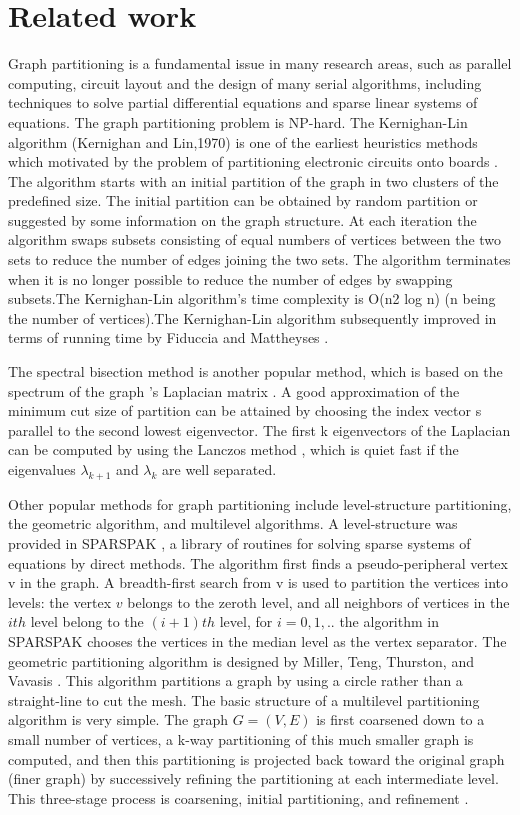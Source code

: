 \documentclass{acm_proc_article-sp}
\begin{document}
\section{Related work}
Graph partitioning is a fundamental issue in many research areas, such as parallel computing, circuit layout and the design of many serial algorithms, including techniques to solve partial differential equations and sparse linear systems of equations. The graph partitioning problem is NP-hard. The Kernighan-Lin algorithm (Kernighan and Lin,1970) is one of the earliest heuristics methods which motivated by the problem of partitioning electronic circuits onto boards \cite{kl:partition}. The algorithm starts with an initial partition of the graph in two clusters of the predefined size. The initial partition can be obtained by random partition or suggested by some information on the graph structure. At each iteration the algorithm swaps subsets consisting of equal numbers of vertices between the two sets to reduce the number of edges joining the two sets. The algorithm terminates when it is no longer possible to reduce the number of edges by swapping subsets.The Kernighan-Lin algorithm's time complexity is O(n2 log n) (n being the number of vertices).The Kernighan-Lin algorithm subsequently improved in terms of running time by Fiduccia and Mattheyses \cite{1585498}.
\par
The spectral bisection method is another popular method, which is based on the spectrum of the graph 's Laplacian matrix \cite{barnard:mrsb}. A good approximation of the minimum cut size of partition can be attained by choosing the index vector s parallel to the second lowest eigenvector. The first k eigenvectors of the Laplacian can be computed by using the Lanczos method , which is quiet fast if the eigenvalues $\lambda_{k+1}$ and $\lambda_{k}$ are well separated.
\par
Other popular methods for graph partitioning include level-structure partitioning, the geometric algorithm, and multilevel algorithms. A level-structure was provided in SPARSPAK \cite{tech:sparspak}, a library of routines for solving sparse systems of equations by direct methods. The algorithm first finds a pseudo-peripheral vertex v in the graph. A breadth-first search from v is used to partition the vertices into levels: the vertex $v$ belongs to the zeroth level, and all neighbors of vertices in the $ith$ level belong to the $(i + 1)th$ level, for $i = 0, 1,..$ the algorithm in SPARSPAK chooses the vertices in the median level as the vertex separator. The geometric partitioning algorithm is designed by Miller, Teng, Thurston, and Vavasis \cite{Gary:amp}. This algorithm partitions a graph by using a circle rather than a straight-line to cut the mesh. The basic structure of a multilevel partitioning algorithm is very simple. The graph $G =(V, E)$ is first coarsened down to a small number of vertices, a k-way partitioning of this much smaller graph is computed, and then this partitioning is projected back toward the original graph (finer graph) by successively refining the partitioning at each intermediate level. This three-stage process is coarsening, initial partitioning, and refinement \cite{karypis:multi1}.
\end{document}
